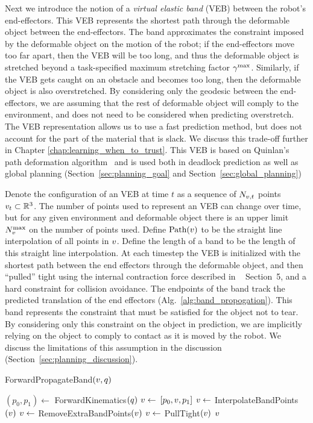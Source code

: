 Next we introduce the notion of a \textit{virtual elastic band} (VEB) between the robot's end-effectors. This VEB represents the shortest path through the deformable object between the end-effectors. The band approximates the constraint imposed by the deformable object on the motion of the robot; if the end-effectors move too far apart, then the VEB will be too long, and thus the deformable object is stretched beyond a task-specified maximum stretching factor $\gamma^{\textrm{max}}$. Similarly, if the VEB gets caught on an obstacle and becomes too long, then the deformable object is also overstretched. By considering only the geodesic between the end-effectors, we are assuming that the rest of deformable object will comply to the environment, and does not need to be considered when predicting overstretch. The VEB representation allows us to use a fast prediction method, but does not account for the part of the material that is slack. We discuss this trade-off further in Chapter \ref{chap:learning_when_to_trust}. This VEB is based on Quinlan's path deformation algorithm~\cite{Quinlan1994} and is used both in deadlock prediction as well as global planning (Section~\ref{sec:planning_goal} and Section~\ref{sec:global_planning})


Denote the configuration of an VEB at time $t$ as a sequence of $N_{v,t}$ points $v_t \subset \mathbb{R}^3$. The number of points used to represent an VEB can change over time, but for any given environment and deformable object there is an upper limit $N_v^\textrm{max}$ on the number of points used. Define $\textrm{Path}(v)$ to be the straight line interpolation of all points in $v$. Define the length of a band to be the length of this straight line interpolation. At each timestep the VEB is initialized with the shortest path between the end effectors through the deformable object, and then ``pulled'' tight using the internal contraction force described in ~\cite{Quinlan1994} Section~5, and a hard constraint for collision avoidance. The endpoints of the band track the predicted translation of the end effectors (Alg.~\ref{alg:band_propogation}). This band represents the constraint that must be satisfied for the object not to tear. By considering only this constraint on the object in prediction, we are implicitly relying on the object to comply to contact as it is moved by the robot. We discuss the limitations of this assumption in the discussion (Section~\ref{sec:planning_discussion}).

\begin{algorithm}[h]
\caption{ForwardPropagateBand$(v, q)$}
\begin{algorithmic}[1]
    \State $(p_0, p_1) \gets$ ForwardKinematics$(q)$
    \State $v \gets$ $[p_0, v, p_1]$
    \State $v \gets$ InterpolateBandPoints$(v)$
    \State $v \gets$ RemoveExtraBandPoints$(v)$
    \State $v \gets$ PullTight$(v)$
    \State \Return $v$
\end{algorithmic}
\label{alg:band_propogation}
\end{algorithm}

